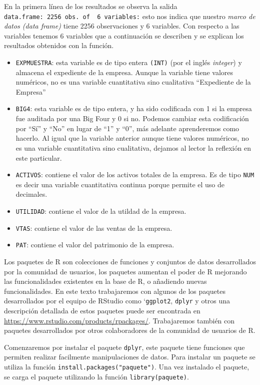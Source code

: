 \documentclass[]{book}
\providecommand{\tightlist}{%
  \setlength{\itemsep}{0pt}\setlength{\parskip}{0pt}}
\begin{document}
En la primera línea de los resultados se observa la salida \texttt{\textquotesingle{}data.frame\textquotesingle{}:\ 2256\ obs.\ of\ \ 6\ variables:} esto nos indica que nuestro \emph{marco de datos (data frame)} tiene 2256 observaciones y 6 variables. Con respecto a las variables tenemos 6 variables que a continuación se describen y se explican los resultados obtenidos con la función.

\begin{itemize}
\tightlist
\item
  \texttt{EXPMUESTRA}: esta variable es de tipo entera \texttt{(INT)} (por el inglés \emph{integer}) y almacena el expediente de la empresa. Aunque la variable tiene valores numéricos, no es una variable cuantitativa sino cualitativa ``Expediente de la Empresa''
\item
  \texttt{BIG4}: esta variable es de tipo entera, y ha sido codificada con 1 si la empresa fue auditada por una Big Four y 0 si no. Podemos cambiar esta codificación por ``Sí'' y ``No'' en lugar de ``1'' y ``0'', más adelante aprenderemos como hacerlo. Al igual que la variable anterior aunque tiene valores numéricos, no es una variable cuantitativa sino cualitativa, dejamos al lector la reflexión en este particular.
\item
  \texttt{ACTIVOS}: contiene el valor de los activos totales de la empresa. Es de tipo \texttt{NUM} es decir una variable cuantitativa continua porque permite el uso de decimales.
\item
  \texttt{UTILIDAD}: contiene el valor de la utildad de la empresa.
\item
  \texttt{VTAS}: contiene el valor de las ventas de la empresa.
\item
  \texttt{PAT}: contiene el valor del patrimonio de la empresa.
\end{itemize}

Los paquetes de R son colecciones de funciones y conjuntos de datos desarrollados por la comunidad de usuarios, los paquetes aumentan el poder de R mejorando las funcionalidades existentes en la base de R, o añadiendo nuevas funcionalidades. En este texto trabajaremos con algunos de los paquetes desarrollados por el equipo de RStudio como `\texttt{ggplot2}, \texttt{dplyr} y otros una descripción detallada de estos paquetes puede ser encontrada en \url{https://www.rstudio.com/products/rpackages/}. Trabajaremos también con paquetes desarrollados por otros colaboradores de la comunidad de usuarios de R.

Comenzaremos por instalar el paquete \texttt{dplyr}, este paquete tiene funciones que permiten realizar facilmente manipulaciones de datos. Para instalar un paquete se utiliza la función \texttt{install.packages("paquete")}. Una vez instalado el paquete, se carga el paquete utilizando la función \texttt{library(paquete)}.
\end{document}
